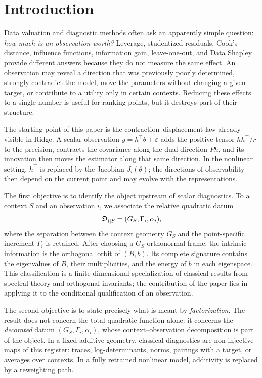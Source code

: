 \section{Introduction}
Data valuation and diagnostic methods often ask an apparently simple question: \emph{how much is an observation worth?} Leverage, studentized residuals, Cook's distance, influence functions, information gain, leave-one-out, and Data Shapley provide different answers because they do not measure the same effect. An observation may reveal a direction that was previously poorly determined, strongly contradict the model, move the parameters without changing a given target, or contribute to a utility only in certain contexts. Reducing these effects to a single number is useful for ranking points, but it destroys part of their structure.

The starting point of this paper is the contraction--displacement law already visible in Ridge. A scalar observation $y=h^\top\theta+\varepsilon$ adds the positive tensor $hh^\top/r$ to the precision, contracts the covariance along the dual direction $Ph$, and its innovation then moves the estimator along that same direction. In the nonlinear setting, $h^\top$ is replaced by the Jacobian $J_i(\theta)$; the directions of observability then depend on the current point and may evolve with the representations.

The first objective is to identify the object upstream of scalar diagnostics. To a context $S$ and an observation $i$, we associate the relative quadratic datum
\[
\mathfrak D_{i\mid S}=(G_S,\Gamma_i,\alpha_i),
\]
where the separation between the context geometry $G_S$ and the point-specific increment $\Gamma_i$ is retained. After choosing a $G_S$-orthonormal frame, the intrinsic information is the orthogonal orbit of $(B,b)$. Its complete signature contains the eigenvalues of $B$, their multiplicities, and the energy of $b$ in each eigenspace. This classification is a finite-dimensional specialization of classical results from spectral theory and orthogonal invariants; the contribution of the paper lies in applying it to the conditional qualification of an observation.

The second objective is to state precisely what is meant by \emph{factorization}. The result does not concern the total quadratic function alone: it concerns the \emph{decorated} datum $(G_S,\Gamma_i,\alpha_i)$, whose context--observation decomposition is part of the object. In a fixed additive geometry, classical diagnostics are non-injective maps of this register: traces, log-determinants, norms, pairings with a target, or averages over contexts. In a fully retrained nonlinear model, additivity is replaced by a reweighting path.


